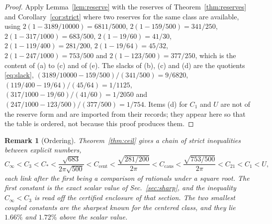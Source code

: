 \documentclass[aps,10pt,superscriptaddress,floatfix,amsmath,amssymb,nofootinbib]{revtex4-2}
\newcommand{\Cinf}{C_\infty}
\newcommand{\Cthree}{C_{3}}
\newcommand{\Cstar}{C_{*}}
\newcommand{\Ccent}{C_{\mathrm{cent}}}
\newcommand{\Ccaus}{C_{\mathrm{caus}}}
\newcommand{\Ctwoone}{C_{21}}
\newcommand{\Cone}{C_{1}}
\newcommand{\Upre}{U}
\newtheorem{remark}{Remark}
\begin{document}
\begin{proof}
Apply Lemma~\ref{lem:reserve} with the reserves of Theorem~\ref{thm:reserves} and
Corollary~\ref{cor:strict} where two reserves for the same class are available, using
$2(1-3189/10000)=6811/5000$, $2(1-159/500)=341/250$, $2(1-317/1000)=683/500$,
$2(1-19/60)=41/30$, $2(1-119/400)=281/200$, $2(1-19/64)=45/32$,
$2(1-247/1000)=753/500$ and $2(1-123/500)=377/250$, which is the content of \rm(a) to \rm(c)
and of \rm(e). The slacks of \rm(b), \rm(c) and \rm(d) are the quotients \eqref{eq:slack},
$(3189/10000-159/500)/(341/500)=9/6820$,
$(119/400-19/64)/(45/64)=1/1125$,
$(317/1000-19/60)/(41/60)=1/2050$ and $(247/1000-123/500)/(377/500)=1/754$.
Items \rm(d) for $\Cone$ and $\Upre$ are not of the reserve form and are imported from their
records; they appear here so that the table is ordered, not because this proof produces
them.
\end{proof}

\begin{remark}[Ordering]\label{rem:ordering}
Theorem~\ref{thm:ceil} gives a chain of strict inequalities between explicit numbers,
\begin{equation}\label{eq:chain}
\Cinf<\Cthree<\Cstar<\frac{\sqrt{683}}{2\pi\sqrt{500}}<\Ccent<\frac{\sqrt{281/200}}{2\pi}
<\Ccaus<\frac{\sqrt{753/500}}{2\pi}<\Ctwoone<\Cone<\Upre ,
\end{equation}
each link after the first being a comparison of rationals under a square root. The first
constant is the exact scalar value of Sec.~\ref{sec:sharp}, and the inequality
$\Cinf<\Cthree$ is read off the certified enclosure of that section. The two smallest
coupled constants are the sharpest known for the centered class, and they lie $1.66\%$ and
$1.72\%$ above the scalar value.
\end{remark}
\end{document}
